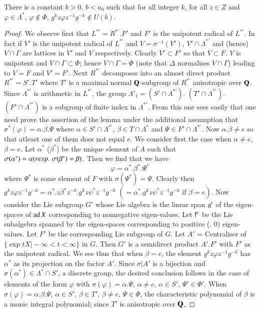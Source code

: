 \setcounter{lemma}{34}
\begin{lemma}\label{art9-lem2.35}
There is a constant $b > 0$, $b < a_0$ such that for all integer $k$, for all $z \in Z$ and $\varphi \in \Lambda^\ast$, $\varphi \not\in \Phi$, $g^k z \varphi z^{-1} g^{-k} \not\in U (b)$.
\end{lemma}

\begin{proof}
We observe first that $L^{\ast'} = R^{\ast'}. F'$ and $F'$ is the unipotent radical of $L^{\ast'}$. In fact if $V'$ is the unipotent radical of $L^{\ast'}$ and $V = \sigma^{-1} (V')$, $V' \cap \Lambda^{\ast'}$ and (hence) $V \cap \Gamma$ are lattices in $V'$ and $V$ respectively. Clearly $V' \subset F'$ so that $V \subset F$. $V$ is unipotent and $V \cap \Gamma \subset \Phi$; hence $V \cap \Gamma = \Phi$ (note that $\Delta$ normalises $V \cap \Gamma$) leading to $V = F$ and $V' = F'$. Next $R^{\ast'}$ decomposes into an almost direct product $R^{\ast'} = S'. T'$ where $T'$ is a maximal normal $\mathbf{Q}$-subgroup of $R^{\ast'}$ anisotropic over $\mathbf{Q}$. Since $\Lambda^{\ast'}$ is arithmetic in $L^{\ast'}$, the group $\Lambda'_1 = (S' \cap \Lambda^{\ast'})$. $(T' \cap \Lambda^{\ast'})$. $(F' \cap \Lambda^{\ast'})$ is a subgroup of finite index in $\Lambda^{\ast'}$. From this one sees easily that one need prove the assertion of the lemma under the additional assumption that $\sigma^\ast(\varphi) = \alpha. \beta. \Psi$ where $\alpha \in S' \cap \Lambda^{\ast'}$, $\beta \in T \cap \Lambda^\ast$ and $\Psi \in F' \cap \Lambda^{\ast'}$. Now $\alpha. \beta \neq e$ so that atleast one of them does not equal $e$. We consider first the case when $\alpha \neq e$, $\beta = e$. Let $\alpha^\ast$ (\resp $\beta^\ast$) be the unique element of $A$ such that $\sigma (\alpha^\ast) = \alpha ({resp.}\kern.3em \sigma (\beta^\ast) = \beta)$. Then we find that we have
$$
\varphi = \alpha^\ast . \beta^\ast. \Psi^\ast
$$
where $\Psi^\ast$ is some element of $F$ with $\sigma (\Psi^\ast) =\Psi$. Clearly then $g^k z \varphi z^{-1} g^{-k} = \alpha^{\ast}. z \beta^{\ast} z^{-k}. g^k z \psi^\ast z^{-1}g^{-k}$ $(= \alpha^{\ast} . g^k z \psi^\ast z^{-1} g^{-k} \text{ if } \beta = e)$. Now consider the Lie subgroup $G'$ whose Lie algebra is the linear span $\mathfrak{g}'$ of the eigen-spaces of $\operatorname{ad} X$ corresponding to nonnegative eigen-values. Let $\mathfrak{f}'$ be the Lie subalgebra spanned by the eigen-spaces corresponding to positive (\resp. 0) eigen-values. Let $F'$ be the corresponding Lie subgroup of $G$. Let $A'$ = Centraliser of $\{\exp t X \big| - \infty < t < \infty\}$ in $G$. Then $G'$ is a semidirect product $A'.F'$ with $F'$ as the unipotent radical. We see thus that when $\beta =e$, the element $g^k z \varphi z^{-1} g^{-k}$ has $\alpha^\ast$ as its projection on the factor $A'$. Since $\sigma|A'$ is a bijection and $\sigma (\alpha^\ast) \in \Lambda^\ast \cap S'$, a discrete group, the desired conclusion follows in the case of elements of the form $\varphi$ with $\sigma (\varphi) = \alpha . \Psi$, $\alpha \neq e$, $\alpha \in S'$, $\Psi' \in \Phi'$. When $\sigma (\varphi)= \alpha. \beta. \Psi$, $\alpha \in S'$, $\beta \in T'$, $\beta \neq e$, $\Psi \in \Phi$, the characteristic polynomial of $\beta$ is a monic integral polynomial; since $T'$ is anisotropic over $\mathbf{Q}$,



\end{proof}
